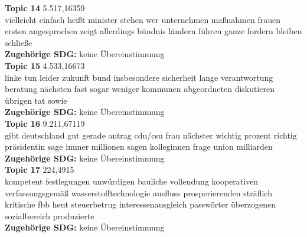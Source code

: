 \documentclass[letterpaper]{article}
\begin{document}
\textbf{Topic 14} 5.517,16359 \\
vielleicht einfach heißt minister stehen wer unternehmen maßnahmen frauen ersten angesprochen zeigt allerdings bündnis ländern führen ganze fordern bleiben schließe   \\
       \textbf{Zugehörige SDG:} keine Übereinstimmung \\
   
\textbf{Topic 15} 4.533,16673 \\
linke tun leider zukunft bund insbesondere sicherheit lange verantwortung beratung nächsten fast sogar weniger kommunen abgeordneten diskutieren übrigen tat sowie   \\
  \textbf{Zugehörige SDG:} keine Übereinstimmung \\
    
\textbf{Topic 16} 9.211,67119 \\
gibt deutschland gut gerade antrag cdu/csu frau nächster wichtig prozent richtig präsidentin sage immer millionen sagen kolleginnen frage union milliarden   \\
  \textbf{Zugehörige SDG:} keine Übereinstimmung \\
     
\textbf{Topic 17} 224,4915 \\
kompetent festlegungen unwürdigen bauliche vollendung kooperativen verfassungsgemäß wasserstofftechnologie ausfluss prosperierenden sträflich kritische fbb heut steuerbetrug interessenausgleich passwörter überzogenen sozialbereich produzierte \\
      \textbf{Zugehörige SDG:} keine Übereinstimmung \\
      
\end{document}
